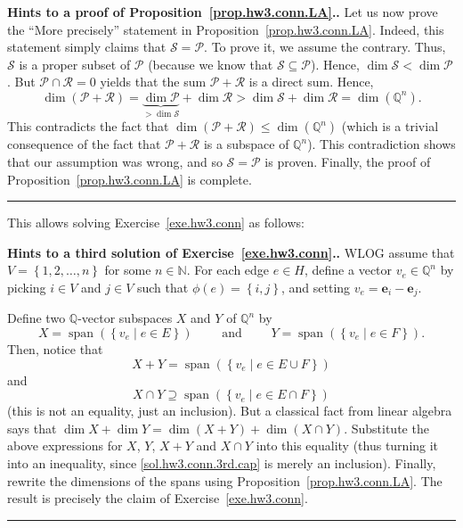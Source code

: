 \documentclass[numbers=enddot,12pt,final,onecolumn,notitlepage]{scrartcl}%
\theoremstyle{definition}
\newenvironment{proof}[1][Proof]{\noindent\textbf{#1.} }{\ \rule{0.5em}{0.5em}}
\newcommand{\NN}{\mathbb{N}}
\newcommand{\QQ}{\mathbb{Q}}
\newcommand{\set}[1]{\left\{ #1 \right\}}
\newcommand{\tup}[1]{\left( #1 \right)}
\newcommand{\spann}[1]{\operatorname{span}\left( #1 \right)}
\begin{document}
\begin{proof}[Hints to a proof of Proposition~\ref{prop.hw3.conn.LA}.]
Let us now prove the ``More precisely'' statement in
Proposition~\ref{prop.hw3.conn.LA}.
Indeed, this statement simply claims that
$\mathcal{S} = \mathcal{P}$.
To prove it, we assume the contrary.
Thus, $\mathcal{S}$ is a proper subset of $\mathcal{P}$
(because we know that $\mathcal{S} \subseteq \mathcal{P}$).
Hence, $\dim \mathcal{S} < \dim \mathcal{P}$.
But $\mathcal{P} \cap \mathcal{R} = 0$ yields that the
sum $\mathcal{P} + \mathcal{R}$ is a direct sum.
Hence,
\[
\dim \tup{\mathcal{P} + \mathcal{R}}
= \underbrace{\dim \mathcal{P}}_{> \dim \mathcal{S}}
+ \dim \mathcal{R}
> \dim \mathcal{S} + \dim \mathcal{R} = \dim \tup{\QQ^n} .
\]
This contradicts the fact that
$\dim \tup{\mathcal{P} + \mathcal{R}} \leq \dim \tup{\QQ^n}$
(which is a trivial consequence of the fact that
$\mathcal{P} + \mathcal{R}$ is a subspace of $\QQ^n$).
This contradiction shows that our assumption was wrong, and
so $\mathcal{S} = \mathcal{P}$ is proven.
Finally, the proof of Proposition~\ref{prop.hw3.conn.LA} is
complete.
\end{proof}

This allows solving Exercise~\ref{exe.hw3.conn} as follows:

\begin{proof}[Hints to a third solution of
 Exercise~\ref{exe.hw3.conn}.]
WLOG assume that $V = \set{1, 2, \ldots, n}$ for some $n \in \NN$.
For each edge $e \in H$, define a vector $v_e \in \QQ^n$
by picking $i \in V$ and $j \in V$ such that
$\phi\tup{e} = \set{i, j}$, and setting
$v_e = \mathbf{e}_i - \mathbf{e}_j$.

Define two $\QQ$-vector subspaces $X$ and $Y$ of $\QQ^n$ by
\[
X = \spann{\set{v_e \mid e \in E}}
\qquad \text{ and } \qquad
Y = \spann{\set{v_e \mid e \in F}} .
\]
Then, notice that
\[
X + Y = \spann{\set{v_e \mid e \in E \cup F}}
\]
and
\begin{equation}
X \cap Y \supseteq \spann{\set{v_e \mid e \in E \cap F}}
\label{sol.hw3.conn.3rd.cap}
\end{equation}
(this is not an equality, just an inclusion).
But a classical fact from linear algebra says that
$\dim X + \dim Y = \dim\tup{X + Y} + \dim\tup{X \cap Y}$.
Substitute the above expressions for $X$, $Y$, $X + Y$ and
$X \cap Y$ into this equality (thus turning it into an
inequality, since \eqref{sol.hw3.conn.3rd.cap}
is merely an inclusion).
Finally, rewrite the dimensions of the spans using
Proposition~\ref{prop.hw3.conn.LA}.
The result is precisely the claim of Exercise~\ref{exe.hw3.conn}.
\end{proof}
\end{document}
